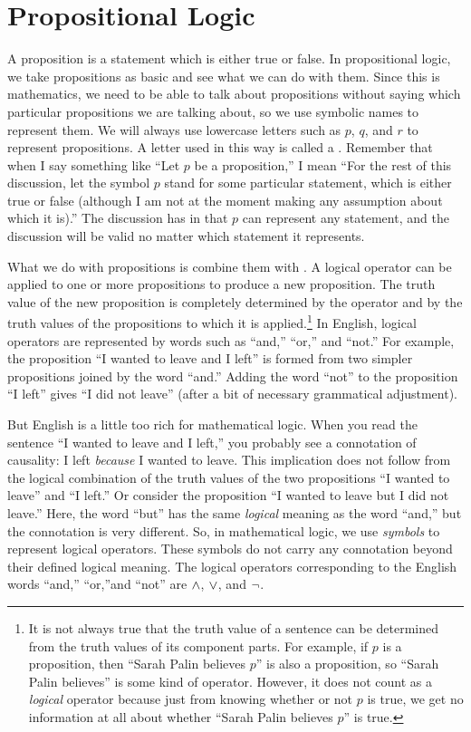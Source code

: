 \section{Propositional Logic}\label{S-logic-1}
A proposition
is a statement which is either true or false.
In propositional logic, we take propositions as basic and
see what we can do with them.  Since this is mathematics, we
need to be able to talk about propositions without saying
which particular propositions we are talking about, so we 
use symbolic names to represent them.  We will always use
lowercase letters such as $p$, $q$, and $r$ to represent
propositions.  A letter used in this way is called a
.  Remember that when I say
something like  ``Let $p$ be a proposition,'' I mean ``For the rest of
this discussion, let the symbol $p$ stand for some particular
statement, which is either true or false (although I am not
at the moment making any assumption about which it is).''
The discussion has  in that
$p$ can represent any statement, and the discussion will be
valid no matter which statement it represents.

What we do with propositions is combine them with
.  A logical operator can be
applied to one or more propositions to produce a new proposition.
The truth value of the new proposition is completely determined
by the operator and by the truth values of the propositions
to which it is applied.\footnote{It is not always true that the
truth value of a sentence can be determined from the truth values
of its component parts.  For example, if $p$ is a proposition,
then ``Sarah Palin believes $p$'' is also a proposition,
so ``Sarah Palin believes'' is some kind of operator.
However, it does not count as a \emph{logical} operator because
just from knowing whether or not $p$ is true, we get no information
at all about whether ``Sarah Palin believes $p$'' is true.}
In English, logical operators are represented by words such
as ``and,'' ``or,'' and ``not.''  For example, the
proposition ``I wanted to leave and I left'' is formed from
two simpler propositions joined by the word ``and.''  Adding
the word ``not'' to the proposition ``I left'' gives
``I did not leave'' (after a bit of necessary grammatical adjustment).

But English is a little too rich for mathematical logic.
When you read the sentence ``I wanted to leave and I left,''
you probably see a connotation of causality:  I left \emph{because}
I wanted to leave.  This implication does not follow from the
logical combination of the truth values of the two propositions
``I wanted to leave'' and ``I left.'' Or consider the
proposition ``I wanted to leave but I did not leave.''
Here, the word ``but'' has the same \emph{logical} meaning
as the word ``and,'' but the connotation is very different.
So, in mathematical logic, we use \emph{symbols} to represent
logical operators.  These symbols do not carry any connotation
beyond their defined logical meaning.  The logical operators
corresponding to the English words ``and,'' ``or,''and ``not'' 
are $\wedge$, $\vee$, and $\lnot$.

